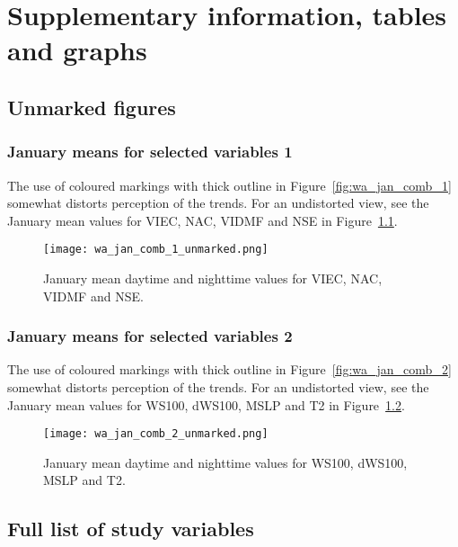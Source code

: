 \chapter{Supplementary information, tables and graphs}
\label{app:supp}

\section{Unmarked figures}
\label{sec:unmarked}

\subsection{January means for selected variables 1}

The use of coloured markings with thick outline in Figure~\ref{fig:wa_jan_comb_1} somewhat distorts perception of the trends. For an undistorted view, see the January mean values for \ac{VIEC}, \ac{NAC}, \ac{VIDMF} and \ac{NSE} in Figure~\ref{fig:wa_jan_comb_1_unmarked}.

\begin{figure}[!htp]
	\centering
	\texttt{[image: wa\_jan\_comb\_1\_unmarked.png]}
	\caption[January means for selected variables 1 (unmarked)]{January mean daytime and nighttime values for \acs{VIEC}, \acs{NAC}, \acs{VIDMF} and \acs{NSE}.}
	\label{fig:wa_jan_comb_1_unmarked}
\end{figure}

\subsection{January means for selected variables 2}

The use of coloured markings with thick outline in Figure~\ref{fig:wa_jan_comb_2} somewhat distorts perception of the trends. For an undistorted view, see the January mean values for \ac{WS100}, \ac{dWS100}, \ac{MSLP} and \ac{T2} in Figure~\ref{fig:wa_jan_comb_2_unmarked}.

\begin{figure}[!htp]
	\centering
	\texttt{[image: wa\_jan\_comb\_2\_unmarked.png]}
	\caption[January means for selected variables 2 (unmarked)]{January mean daytime and nighttime values for \acs{WS100}, \acs{dWS100}, \acs{MSLP} and \acs{T2}.}
	\label{fig:wa_jan_comb_2_unmarked}
\end{figure}

\section{Full list of study variables}

